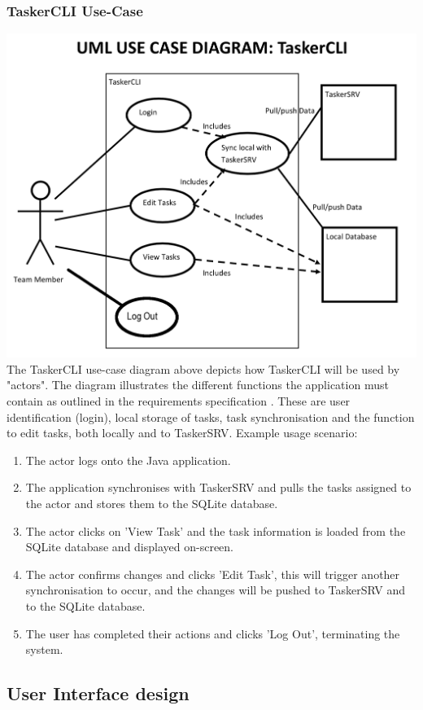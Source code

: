\documentclass{project}
\begin{document}
\subsubsection{TaskerCLI Use-Case}
\includegraphics[width=\textwidth]{images/5.1/TaskerCLIUseCase}
The TaskerCLI use-case diagram above depicts how TaskerCLI will be used by "actors".  The diagram illustrates the different functions the application must contain as outlined in the requirements specification \cite{se.qa.rs}. These are user identification (login), local storage of tasks, task synchronisation and the function to edit tasks, both locally and to TaskerSRV. Example usage scenario:
\begin{enumerate}
	\item The actor logs onto the Java application.
	\item The application synchronises with TaskerSRV and pulls the tasks assigned to the actor and stores them to the SQLite database.
	\item The actor clicks on 'View Task' and the task information is loaded from the SQLite database and displayed on-screen.
	\item The actor confirms changes and clicks 'Edit Task', this will trigger another synchronisation to occur, and the changes will be pushed to TaskerSRV and to the SQLite database.
	\item The user has completed their actions and clicks 'Log Out', terminating the system.
\end {enumerate}	
\subsection{User Interface design}
\end{document}
